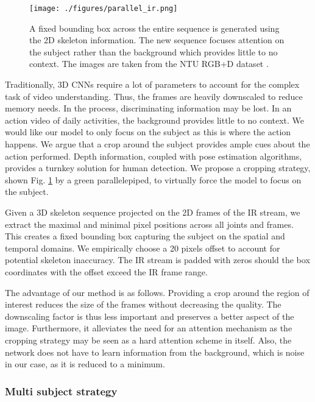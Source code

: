 \documentclass[letterpaper, 10 pt, conference]{ieeeconf}
\begin{document}
\begin{figure}[t]
  \centering
  \texttt{[image: ./figures/parallel\_ir.png]}
  \caption{A fixed bounding box across the entire sequence is generated using the 2D skeleton information. The new sequence focuses attention on the subject rather than the background which provides little to no context. The images are taken from the NTU RGB+D dataset \cite{shahroudy2016ntu}.}
  \label{parallel_ir}
\end{figure}

Traditionally, 3D CNNs require a lot of parameters to account for the complex task of video understanding. Thus, the frames are heavily downscaled to reduce memory needs. In the process, discriminating information may be lost. In an action video of daily activities, the background provides little to no context. We would like our model to only focus on the subject as this is where the action happens. We argue that a crop around the subject provides ample cues about the action performed. Depth information, coupled with pose estimation algorithms, provides a turnkey solution for human detection. We propose a cropping strategy, shown Fig. \ref{parallel_ir} by a green parallelepiped, to virtually force the model to focus on the subject.

Given a 3D skeleton sequence projected on the 2D frames of the IR stream, we extract the maximal and minimal pixel positions across all joints and frames. This creates a fixed bounding box capturing the subject on the spatial and temporal domains. We empirically choose a 20 pixels offset to account for potential skeleton inaccuracy. The IR stream is padded with zeros should the box coordinates with the offset exceed the IR frame range. 

The advantage of our method is as follows. Providing a crop around the region of interest reduces the size of the frames without decreasing the quality. The downscaling factor is thus less important and preserves a better aspect of the image. Furthermore, it alleviates the need for an attention mechanism as the cropping strategy may be seen as a hard attention scheme in itself. Also, the network does not have to learn information from the background, which is noise in our case, as it is reduced to a minimum.


\subsubsection{Multi subject strategy}
\end{document}
